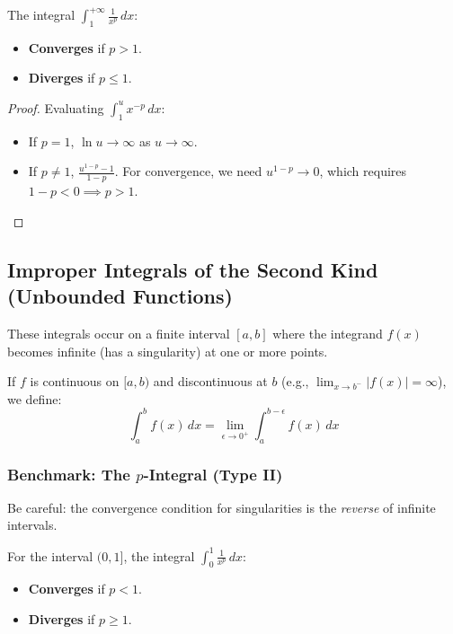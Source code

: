 \begin{theorem}
The integral $\int_1^{+\infty} \frac{1}{x^p} \, dx$:
\begin{itemize}
    \item \textbf{Converges} if $p > 1$.
    \item \textbf{Diverges} if $p \leq 1$.
\end{itemize}
\end{theorem}
\begin{proof}
Evaluating $\int_1^u x^{-p} \, dx$:
\begin{itemize}
    \item If $p=1$, $\ln u \to \infty$ as $u \to \infty$.
    \item If $p \neq 1$, $\frac{u^{1-p}-1}{1-p}$. For convergence, we need $u^{1-p} \to 0$, which requires $1-p < 0 \implies p > 1$.
\end{itemize}
\end{proof}

\subsection{Improper Integrals of the Second Kind (Unbounded Functions)}

These integrals occur on a finite interval $[a,b]$ where the integrand $f(x)$ becomes infinite (has a singularity) at one or more points.

\begin{definition}
If $f$ is continuous on $[a, b)$ and discontinuous at $b$ (e.g., $\lim_{x \to b^-} |f(x)| = \infty$), we define:
\[
\int_a^b f(x) \, dx = \lim_{\epsilon \to 0^+} \int_a^{b-\epsilon} f(x) \, dx
\]
\end{definition}

\subsubsection{Benchmark: The \texorpdfstring{$p$}{p}-Integral (Type II)}
Be careful: the convergence condition for singularities is the \textit{reverse} of infinite intervals.

\begin{theorem}
For the interval $(0, 1]$, the integral $\int_0^1 \frac{1}{x^p} \, dx$:
\begin{itemize}
    \item \textbf{Converges} if $p < 1$.
    \item \textbf{Diverges} if $p \geq 1$.
\end{itemize}
\end{theorem}

